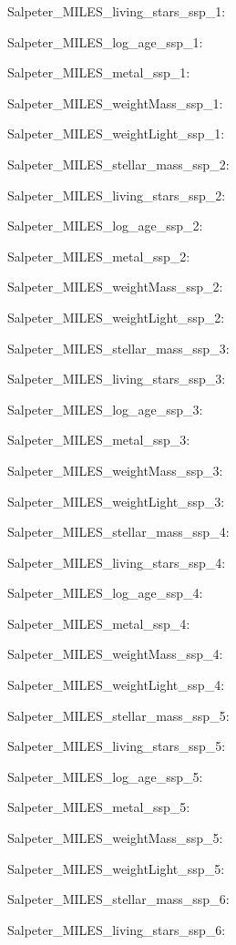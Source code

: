 \item Salpeter\_MILES\_living\_stars\_ssp\_1: 
\item Salpeter\_MILES\_log\_age\_ssp\_1: 
\item Salpeter\_MILES\_metal\_ssp\_1: 
\item Salpeter\_MILES\_weightMass\_ssp\_1: 
\item Salpeter\_MILES\_weightLight\_ssp\_1: 
\item Salpeter\_MILES\_stellar\_mass\_ssp\_2: 
\item Salpeter\_MILES\_living\_stars\_ssp\_2: 
\item Salpeter\_MILES\_log\_age\_ssp\_2: 
\item Salpeter\_MILES\_metal\_ssp\_2: 
\item Salpeter\_MILES\_weightMass\_ssp\_2: 
\item Salpeter\_MILES\_weightLight\_ssp\_2: 
\item Salpeter\_MILES\_stellar\_mass\_ssp\_3: 
\item Salpeter\_MILES\_living\_stars\_ssp\_3: 
\item Salpeter\_MILES\_log\_age\_ssp\_3: 
\item Salpeter\_MILES\_metal\_ssp\_3: 
\item Salpeter\_MILES\_weightMass\_ssp\_3: 
\item Salpeter\_MILES\_weightLight\_ssp\_3: 
\item Salpeter\_MILES\_stellar\_mass\_ssp\_4: 
\item Salpeter\_MILES\_living\_stars\_ssp\_4: 
\item Salpeter\_MILES\_log\_age\_ssp\_4: 
\item Salpeter\_MILES\_metal\_ssp\_4: 
\item Salpeter\_MILES\_weightMass\_ssp\_4: 
\item Salpeter\_MILES\_weightLight\_ssp\_4: 
\item Salpeter\_MILES\_stellar\_mass\_ssp\_5: 
\item Salpeter\_MILES\_living\_stars\_ssp\_5: 
\item Salpeter\_MILES\_log\_age\_ssp\_5: 
\item Salpeter\_MILES\_metal\_ssp\_5: 
\item Salpeter\_MILES\_weightMass\_ssp\_5: 
\item Salpeter\_MILES\_weightLight\_ssp\_5: 
\item Salpeter\_MILES\_stellar\_mass\_ssp\_6: 
\item Salpeter\_MILES\_living\_stars\_ssp\_6: 
